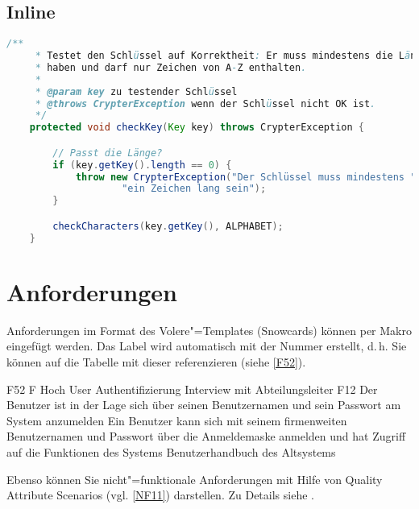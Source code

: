


\subsection{Inline}

\begin{lstlisting}[language=Java,caption=Methode checkKey()]
    /**
     * Testet den Schlüssel auf Korrektheit: Er muss mindestens die Länge 1
     * haben und darf nur Zeichen von A-Z enthalten.
     *
     * @param key zu testender Schlüssel
     * @throws CrypterException wenn der Schlüssel nicht OK ist.
     */
    protected void checkKey(Key key) throws CrypterException {

        // Passt die Länge?
        if (key.getKey().length == 0) {
            throw new CrypterException("Der Schlüssel muss mindestens " +
                    "ein Zeichen lang sein");
        }

        checkCharacters(key.getKey(), ALPHABET);
    }
\end{lstlisting}


\section{Anforderungen}

Anforderungen im Format des Volere"=Templates (Snowcards) \autocite{Volere} können per Makro eingefügt werden. Das Label wird automatisch mit der Nummer erstellt, d.\,h. Sie können auf die Tabelle mit dieser referenzieren (siehe \autoref{F52}).

\snowcard %
   {F52} %
   {F} %
   {Hoch} %
   {User Authentifizierung} %
   {Interview mit Abteilungsleiter} %
   {F12} %
   {Der Benutzer ist in der Lage sich über seinen
    Benutzernamen und sein Passwort am System anzumelden} %
   {Ein Benutzer kann sich mit seinem firmenweiten Benutzernamen und
   Passwort über die Anmeldemaske anmelden und hat Zugriff auf die
   Funktionen des Systems} %
   {Benutzerhandbuch des Altsystems} %

Ebenso können Sie nicht"=funktionale Anforderungen mit Hilfe von Quality Attribute Scenarios (vgl. \autoref{NF11}) darstellen. Zu Details siehe \autocite{Barbacci2003}.

